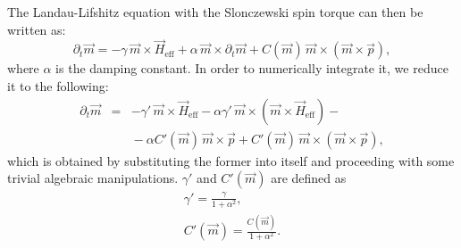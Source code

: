 \documentclass[11pt]{article}
\newcommand{\vv}[1]{\vec{#1}}
\newcommand{\vvm}{\vv{m}}
\newcommand{\vvH}{\vv{H}_{\mathrm{eff}}}
\newcommand{\vvfix}{\vv{p}}
\newcommand{\derivp}[2]{\partial_{#2} #1}
\begin{document}
The Landau-Lifshitz equation with the Slonczewski spin torque can then be written as:
$$
\derivp{\vvm}{t} = 
  -\gamma \, \vvm \times \vvH
  + \alpha \, \vvm \times \derivp{\vvm}{t}
  + C(\vvm) \, \vvm \times (\vvm \times \vvfix),
$$
where $\alpha$ is the damping constant.
In order to numerically integrate it, we reduce it to the following:
$$
\begin{array}{ccc}
\derivp{\vvm}{t} & = & 
  -\gamma' \, \vvm \times \vvH
  - \alpha \gamma' \, \vvm \times (\vvm \times \vvH) - {} \\
& & {} - \alpha C'(\vvm) \, \vvm \times \vvfix
  + C'(\vvm) \, \vvm \times (\vvm \times \vvfix),
\end{array}
$$
which is obtained by substituting the former into itself and proceeding
with some trivial algebraic manipulations.
$\gamma'$ and $C'(\vvm)$ are defined as
\begin{eqnarray}
\gamma' = \frac{\gamma}{1 + \alpha^2}, \nonumber \\
C'(\vvm) = \frac{C(\vvm)}{1 + \alpha^2}. \nonumber
\end{eqnarray}
\end{document}

